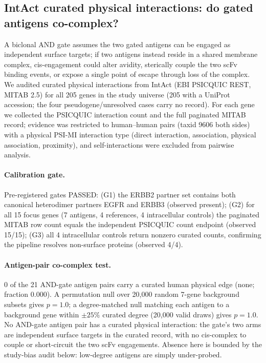 \subsection{IntAct curated physical interactions: do gated antigens co-complex?}
\label{sec:intact}
A biclonal AND gate assumes the two gated antigens can be engaged as
independent surface targets; if two antigens instead reside in a shared
membrane complex, cis-engagement could alter avidity, sterically couple the
two scFv binding events, or expose a single point of escape through loss of
the complex. We audited curated physical interactions from IntAct (EBI
PSICQUIC REST, MITAB 2.5) for all 205 genes in the study universe
(205 with a UniProt accession; the four pseudogene/unresolved cases carry
no record). For each gene we collected the PSICQUIC interaction count and
the full paginated MITAB record; evidence was restricted to human--human
pairs (taxid 9606 both sides) with a physical PSI-MI interaction type
(direct interaction, association, physical association, proximity), and
self-interactions were excluded from pairwise analysis.

\paragraph{Calibration gate.} Pre-registered gates PASSED: (G1) the ERBB2
partner set contains both canonical heterodimer partners EGFR and ERBB3
(observed present); (G2) for all 15 focus genes (7 antigens, 4 references,
4 intracellular controls) the paginated MITAB row count equals the
independent PSICQUIC count endpoint (observed 15/15); (G3) all 4
intracellular controls return nonzero curated counts, confirming the
pipeline resolves non-surface proteins (observed 4/4).

\paragraph{Antigen-pair co-complex test.} 0 of the 21 AND-gate
antigen pairs carry a curated human physical edge (none; fraction
0.000). A permutation null over 20{,}000 random 7-gene background
subsets gives $p=1.0$; a degree-matched null matching each antigen to a
background gene within $\pm25\%$ curated degree (20{,}000 valid draws)
gives $p=1.0$. No AND-gate antigen pair has a curated physical interaction: the gate's two arms are independent surface targets in the curated record, with no cis-complex to couple or short-circuit the two scFv engagements. Absence here is bounded by the study-bias audit below: low-degree antigens are simply under-probed.

